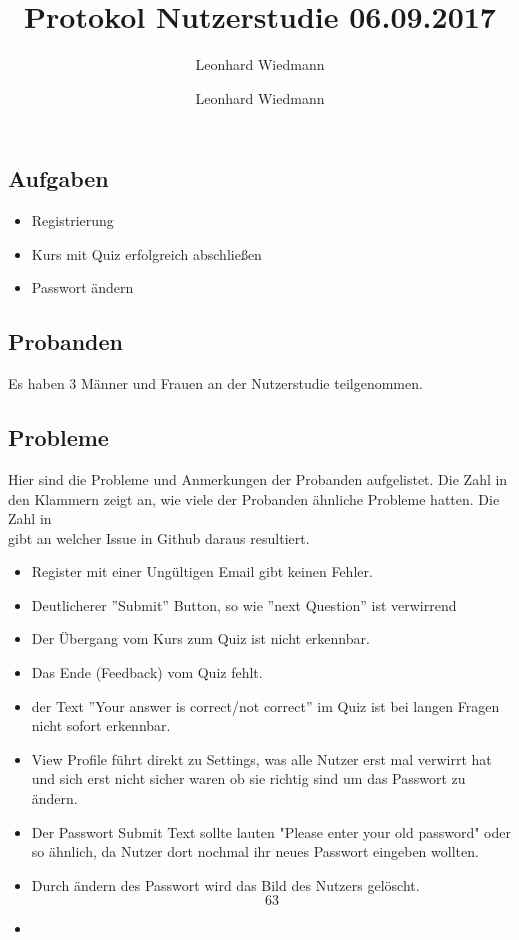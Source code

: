 \documentclass[colorback, accentcolor=tud1c, paper=a4]{tudexercise}
\title{Protokol Nutzerstudie 06.09.2017}
\subtitle{Leonhard Wiedmann}
\author{Leonhard Wiedmann}
\begin{document}
\maketitle
\subsection*{Aufgaben}
\begin{itemize}
  \item Registrierung
  \item Kurs mit Quiz erfolgreich abschließen
  \item Passwort ändern
\end{itemize}

\subsection*{Probanden}
Es haben 3 Männer und Frauen an der Nutzerstudie teilgenommen.

\subsection*{Probleme}
 Hier sind die Probleme und Anmerkungen der Probanden aufgelistet. Die Zahl in den Klammern zeigt an, wie viele der Probanden ähnliche Probleme hatten. Die Zahl in \[\] gibt an welcher Issue in Github daraus resultiert.
  \begin{itemize}
		\item Register mit einer Ungültigen Email gibt keinen Fehler.
    		\item Deutlicherer ''Submit'' Button, so wie ''next Question'' ist verwirrend
		\item Der Übergang vom Kurs zum Quiz ist nicht erkennbar.
		\item Das Ende (Feedback) vom Quiz fehlt.
		\item der Text ''Your answer is correct/not correct'' im Quiz ist bei langen Fragen nicht sofort erkennbar.
		\item View Profile führt direkt zu Settings, was alle Nutzer erst mal verwirrt hat und sich erst nicht sicher waren ob sie richtig sind um das Passwort zu ändern.
		\item Der Passwort Submit Text sollte lauten "Please enter your old password" oder so ähnlich, da Nutzer dort nochmal ihr neues Passwort eingeben wollten.
		\item Durch ändern des Passwort wird das Bild des Nutzers gelöscht. \[63\]
		\item
   \end{itemize}
\end{document}
